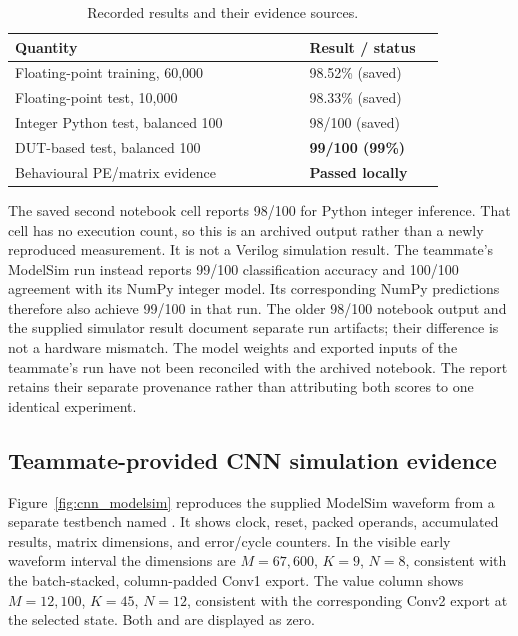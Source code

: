 \documentclass[10pt,twocolumn,letterpaper]{article}
\newcommand{\code}[1]{\texttt{\detokenize{#1}}}
\begin{document}
\begin{table}[t]\centering\small
\caption{Recorded results and their evidence sources.}\label{tab:status}
\begin{tabular}{@{}p{0.61\linewidth}p{0.29\linewidth}@{}}\toprule
Quantity & Result / status\\\midrule
Floating-point training, 60,000 & 98.52\% (saved)\\
Floating-point test, 10,000 & 98.33\% (saved)\\
Integer Python test, balanced 100 & 98/100 (saved)\\
DUT-based test, balanced 100 & \textbf{99/100 (99\%)}\\
Behavioural PE/matrix evidence & \textbf{Passed locally}\\\bottomrule
\end{tabular}
\end{table}
The saved second notebook cell reports 98/100 for Python integer inference.
That cell has no execution count, so this is an archived output rather than
a newly reproduced measurement. It is not a Verilog simulation result.
The teammate's ModelSim run instead reports 99/100 classification accuracy
and 100/100 agreement with its NumPy integer model. Its corresponding
NumPy predictions therefore also achieve 99/100 in that run. The older
98/100 notebook output and the supplied simulator result document separate
run artifacts; their difference is not a hardware mismatch. The model
weights and exported inputs of the teammate's run have not been reconciled
with the archived notebook. The report retains their separate provenance
rather than attributing both scores to one identical experiment.

\subsection{Teammate-provided CNN simulation evidence}
Figure~\ref{fig:cnn_modelsim} reproduces the supplied ModelSim waveform
from a separate testbench named \code{tb_cnn}. It shows clock, reset,
packed operands, accumulated results, matrix dimensions, and error/cycle
counters. In the visible early waveform interval the dimensions are
$M=67{,}600$, $K=9$, $N=8$, consistent with the batch-stacked, column-padded
Conv1 export. The value column shows $M=12{,}100$, $K=45$, $N=12$,
consistent with the corresponding Conv2 export at the selected state.
Both \code{errors} and \code{total_errors} are displayed as zero.
\end{document}
